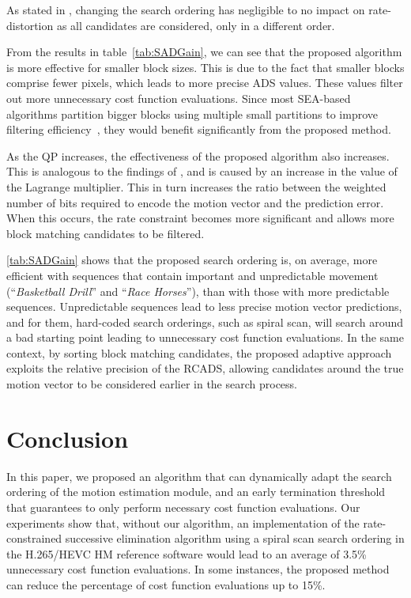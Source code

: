 \documentclass{article}
\begin{document}
As stated in \cite{Trud14}, changing the search ordering has negligible to no impact on rate-distortion as all candidates are considered, only in a different order. 

From the results in table~\ref{tab:SADGain}, we can see that the proposed algorithm is more effective for smaller block sizes. This is due to the fact that smaller blocks comprise fewer pixels, which leads to more precise ADS values. These values filter out more unnecessary cost function evaluations. Since most SEA-based algorithms partition bigger blocks using multiple small partitions to improve filtering efficiency~\cite{Gao2000, Zhu2005a, Yang2004, Toivonen2004}, they would benefit significantly from the proposed method.

As the QP increases, the effectiveness of the proposed algorithm also increases. This is analogous to the findings of \cite{Coban1998}, and is caused by an increase in the value of the Lagrange multiplier. This in turn increases the ratio between the weighted number of bits required to encode the motion vector and the prediction error. When this occurs, the rate constraint becomes more significant and allows more block matching candidates to be filtered.

\autoref{tab:SADGain} shows that the proposed search ordering is, on average, more efficient with sequences that contain important and unpredictable movement (``\textit{Basketball Drill}'' and ``\textit{Race Horses}''),  than with those with more predictable sequences. Unpredictable sequences lead to less precise motion vector predictions, and for them, hard-coded search orderings, such as spiral scan, will search around a bad starting point leading to unnecessary cost function evaluations. In the same context, by sorting block matching candidates, the proposed adaptive approach exploits the relative precision of the RCADS, allowing candidates around the true motion vector to be considered earlier in the search process.


\section{Conclusion}
\label{sec:conclusion}
In this paper, we proposed an algorithm that can dynamically adapt the search ordering of the motion estimation module, and an early termination threshold that guarantees to only perform necessary cost function evaluations. Our experiments show that, without our algorithm, an implementation of the rate-constrained successive elimination algorithm using a spiral scan search ordering in the H.265/HEVC HM reference software would lead to an average of 3.5\% unnecessary cost function evaluations. In some instances, the proposed method can reduce the percentage of cost function evaluations up to 15\%.



\end{document}
